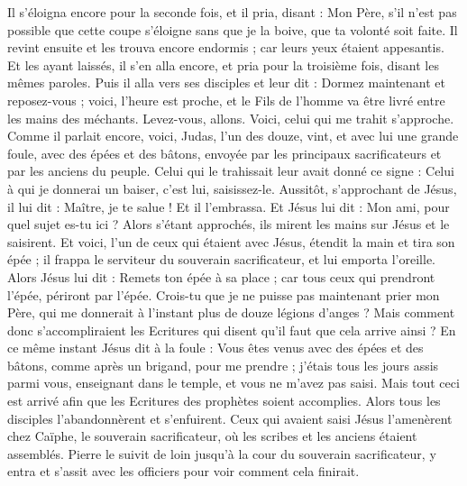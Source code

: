 \begin{multicols}{2}
Il s'éloigna encore pour la seconde fois, et il pria, disant : Mon Père, s'il n'est pas possible que cette coupe s'éloigne sans que je la boive, que ta volonté soit faite.
Il revint ensuite et les trouva encore endormis ; car leurs yeux étaient appesantis.
Et les ayant laissés, il s'en alla encore, et pria pour la troisième fois, disant les mêmes paroles.
Puis il alla vers ses disciples et leur dit : Dormez maintenant et reposez-vous ; voici, l'heure est proche, et le Fils de l'homme va être livré entre les mains des méchants.
Levez-vous, allons. Voici, celui qui me trahit s'approche.
Comme il parlait encore, voici, Judas, l'un des douze, vint, et avec lui une grande foule, avec des épées et des bâtons, envoyée par les principaux sacrificateurs et par les anciens du peuple.
Celui qui le trahissait leur avait donné ce signe : Celui à qui je donnerai un baiser, c'est lui, saisissez-le.
Aussitôt, s'approchant de Jésus, il lui dit : Maître, je te salue ! Et il l'embrassa.
Et Jésus lui dit : Mon ami, pour quel sujet es-tu ici ? Alors s'étant approchés, ils mirent les mains sur Jésus et le saisirent.
Et voici, l'un de ceux qui étaient avec Jésus, étendit la main et tira son épée ; il frappa le serviteur du souverain sacrificateur, et lui emporta l'oreille.
Alors Jésus lui dit : Remets ton épée à sa place ; car tous ceux qui prendront l'épée, périront par l'épée.
Crois-tu que je ne puisse pas maintenant prier mon Père, qui me donnerait à l'instant plus de douze légions d'anges ?
Mais comment donc s'accompliraient les Ecritures qui disent qu'il faut que cela arrive ainsi ?
En ce même instant Jésus dit à la foule : Vous êtes venus avec des épées et des bâtons, comme après un brigand, pour me prendre ; j'étais tous les jours assis parmi vous, enseignant dans le temple, et vous ne m'avez pas saisi.
Mais tout ceci est arrivé afin que les Ecritures des prophètes soient accomplies. Alors tous les disciples l'abandonnèrent et s'enfuirent.
Ceux qui avaient saisi Jésus l'amenèrent chez Caïphe, le souverain sacrificateur, où les scribes et les anciens étaient assemblés.
Pierre le suivit de loin jusqu'à la cour du souverain sacrificateur, y entra et s'assit avec les officiers pour voir comment cela finirait.

\end{multicols}
